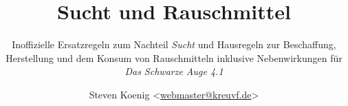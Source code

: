 
\label{img-title}
~ %
\BgThispage
{}
\clearpage
\pagebreak

\BgThispage
\label{img-title-grey}
\title{Sucht und Rauschmittel}
\subtitle{Inoffizielle Ersatzregeln zum Nachteil \emph{Sucht} und Hausregeln zur Beschaffung, Herstellung und dem Konsum von Rauschmitteln inklusive Nebenwirkungen für \emph{Das Schwarze Auge 4.1}}
\author{Steven Koenig <\href{mailto:webmaster@kreuvf.de}{webmaster@kreuvf.de}>}
\date{\gitAuthorDate{}}
\maketitle

